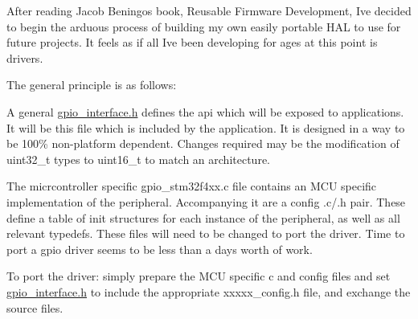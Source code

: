 After reading Jacob Beningo\textquotesingle{}s book, Reusable Firmware Development, I\textquotesingle{}ve decided to begin the arduous process of building my own easily portable H\+AL to use for future projects. It feels as if all I\textquotesingle{}ve been developing for ages at this point is drivers.

The general principle is as follows\+:
\begin{DoxyItemize}
\item A general \hyperlink{gpio__interface_8h}{gpio\+\_\+interface.\+h} defines the api which will be exposed to applications. It will be this file which is included by the application. It is designed in a way to be 100\% non-\/platform dependent. Changes required may be the modification of uint32\+\_\+t types to uint16\+\_\+t to match an architecture.
\item The micrcontroller specific gpio\+\_\+stm32f4xx.\+c file contains an M\+CU specific implementation of the peripheral. Accompanying it are a config .c/.h pair. These define a table of init structures for each instance of the peripheral, as well as all relevant typedefs. These files will need to be changed to port the driver. Time to port a gpio driver seems to be less than a day\textquotesingle{}s worth of work.
\item To port the driver\+: simply prepare the M\+CU specific c and config files and set \hyperlink{gpio__interface_8h}{gpio\+\_\+interface.\+h} to include the appropriate xxxxx\+\_\+config.\+h file, and exchange the source files. 
\end{DoxyItemize}